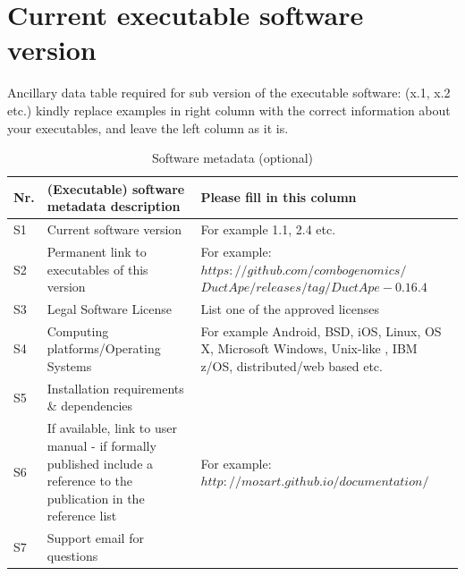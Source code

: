 \documentclass[authoryear,preprint,review,12pt]{elsarticle}
\begin{document}
\section*{Current executable software version}
\label{sec:current_executable_version}

Ancillary data table required for sub version of the executable software: (x.1, x.2 etc.) kindly replace examples in right column with the correct information about your executables, and leave the left column as it is.

\begin{table}[!h]
\begin{tabular}{|l|p{6.5cm}|p{6.5cm}|}
\hline
\textbf{Nr.} & \textbf{(Executable) software metadata description} & \textbf{Please fill in this column} \\
\hline
S1 & Current software version & For example 1.1, 2.4 etc. \\
\hline
S2 & Permanent link to executables of this version  & For example: $https://github.com/combogenomics/$ $DuctApe/releases/tag/DuctApe-0.16.4$ \\
\hline
S3 & Legal Software License & List one of the approved licenses \\
\hline
S4 & Computing platforms/Operating Systems & For example Android, BSD, iOS, Linux, OS X, Microsoft Windows, Unix-like , IBM z/OS, distributed/web based etc. \\
\hline
S5 & Installation requirements \& dependencies & \\
\hline
S6 & If available, link to user manual - if formally published include a reference to the publication in the reference list & For example: $http://mozart.github.io/documentation/$ \\
\hline
S7 & Support email for questions & \\
\hline
\end{tabular}
\caption{Software metadata (optional)}
\label{software_metadata} 
\end{table}
\end{document}
